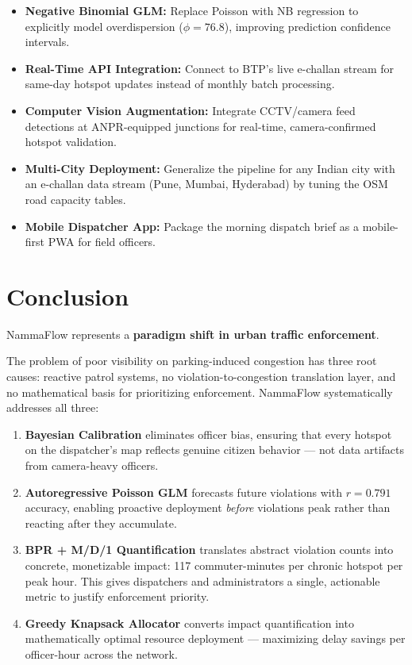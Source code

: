 \documentclass[12pt,a4paper]{article}
\begin{document}
\begin{itemize}[leftmargin=1.5em, itemsep=4pt]
    \item \textbf{Negative Binomial GLM:} Replace Poisson with NB regression to explicitly model overdispersion ($\phi = 76.8$), improving prediction confidence intervals.
    \item \textbf{Real-Time API Integration:} Connect to BTP's live e-challan stream for same-day hotspot updates instead of monthly batch processing.
    \item \textbf{Computer Vision Augmentation:} Integrate CCTV/camera feed detections at ANPR-equipped junctions for real-time, camera-confirmed hotspot validation.
    \item \textbf{Multi-City Deployment:} Generalize the pipeline for any Indian city with an e-challan data stream (Pune, Mumbai, Hyderabad) by tuning the OSM road capacity tables.
    \item \textbf{Mobile Dispatcher App:} Package the morning dispatch brief as a mobile-first PWA for field officers.
\end{itemize}

\section{Conclusion}

NammaFlow represents a \textbf{paradigm shift in urban traffic enforcement}.

The problem of poor visibility on parking-induced congestion has three root causes: reactive patrol systems, no violation-to-congestion translation layer, and no mathematical basis for prioritizing enforcement. NammaFlow systematically addresses all three:

\begin{enumerate}[leftmargin=2em, itemsep=4pt]
    \item \textbf{Bayesian Calibration} eliminates officer bias, ensuring that every hotspot on the dispatcher's map reflects genuine citizen behavior — not data artifacts from camera-heavy officers.
    
    \item \textbf{Autoregressive Poisson GLM} forecasts future violations with $r = 0.791$ accuracy, enabling proactive deployment \textit{before} violations peak rather than reacting after they accumulate.
    
    \item \textbf{BPR + M/D/1 Quantification} translates abstract violation counts into concrete, monetizable impact: 117 commuter-minutes per chronic hotspot per peak hour. This gives dispatchers and administrators a single, actionable metric to justify enforcement priority.
    
    \item \textbf{Greedy Knapsack Allocator} converts impact quantification into mathematically optimal resource deployment — maximizing delay savings per officer-hour across the network.
\end{enumerate}
\end{document}
